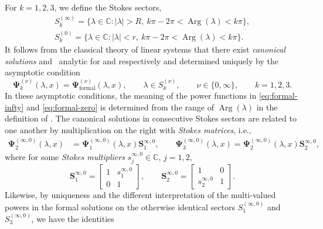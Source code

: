 \documentclass[11pt]{article}
\numberwithin{equation}{section}
\numberwithin{equation}{section}
\newcommand{\C}{{\mathbb{C}}}
\renewcommand{\arg}{\operatorname{Arg}}
\begin{document}
For $k = 1, 2,3$, we define the Stokes sectors,
\begin{gather*}
S_k^{(\infty)} = \bigl\{ \lambda \in \C \colon |\lambda| > R, \ k\pi - 2\pi < \arg (\lambda) < k\pi \bigr \},\\
S_k^{(0)} = \bigl \{ \lambda \in \C \colon |\lambda| < r, \ k\pi - 2\pi < \arg (\lambda) < k\pi \bigr\}.
\end{gather*}
 It follows from the classical theory of linear systems that there exist \emph{canonical solutions}  and~ analytic for  and  respectively and determined uniquely by the asymptotic condition
\begin{equation}
\mathbf{\Psi}_k^{(\nu)}(\lambda, x) = \mathbf{\Psi}^{(\nu)}_{\text{formal}}(\lambda, x), \qquad \lambda \in S_k^{(\nu)}, \qquad \nu \in \{0, \infty\}, \qquad k=1,2,3.
\label{eq:psi-asymptotic-condition}
\end{equation}
In these asymptotic conditions, the meaning of the power functions in \eqref{eq:formal-infty} and \eqref{eq:formal-zero} is determined from the range of $\arg(\lambda)$ in the definition of .
The canonical solutions in consecutive Stokes sectors are related to one another by multiplication on the right with \emph{Stokes matrices}, i.e.,
\begin{align}%
\label{eq:stokes-condition-1}\mathbf{\Psi}_2^{(\infty, 0)}(\lambda, x) &= \mathbf{\Psi}_1^{(\infty, 0)}(\lambda, x) \mathbf{S}^{\infty, 0}_{1}, \qquad
\mathbf{\Psi}_3^{(\infty, 0)}(\lambda, x) = \mathbf{\Psi}_2^{(\infty, 0)}( \lambda, x) \mathbf{S}^{\infty, 0}_{2},
\end{align}
where for some \emph{Stokes multipliers} $s_j^{\infty,0}\in\mathbb{C}$, $j=1,2$,
\begin{equation}
\mathbf{S}^{\infty, 0}_{1}= \begin{bmatrix}1&s^{\infty, 0}_1\\0&1\end{bmatrix},\qquad \mathbf{S}^{\infty, 0}_{{2}}=
\begin{bmatrix}1&0\\{s^{\infty, 0}_2}&1\end{bmatrix}.
 \label{eq:Stokes-infty}
\end{equation}
Likewise, by uniqueness and the different interpretation of the multi-valued powers in the formal solutions on the otherwise identical sectors $S^{(\infty,0)}_1$ and $S^{(\infty,0)}_3$, we have the identities
\end{document}
